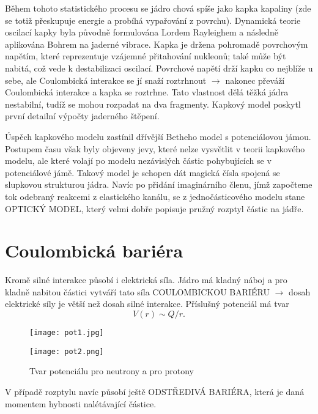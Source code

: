 \documentclass[../../main.tex]{subfiles}
\begin{document}
	Během tohoto statistického procesu se jádro chová spíše jako kapka kapaliny (zde se totiž přeskupuje energie a probíhá vypařování z povrchu). Dynamická teorie oscilací kapky byla původně formulována Lordem Rayleighem a následně aplikována Bohrem na jaderné vibrace. Kapka je držena pohromadě povrchovým napětím, které reprezentuje vzájemné přitahování nukleonů; také může být nabitá, což vede k destabilizaci oscilací. Povrchové napětí drží kapku co nejblíže u sebe, ale Coulombická interakce se jí snaží roztrhnout $\rightarrow$ nakonec převáží Coulombická interakce a kapka se roztrhne. Tato vlastnost dělá těžká jádra nestabilní, tudíž se mohou rozpadat na dva fragmenty. Kapkový model poskytl první detailní výpočty jaderného štěpení. 
	
	Úspěch kapkového modelu zastínil dřívější Betheho model s potenciálovou jámou. Postupem času však byly objeveny jevy, které nelze vysvětlit v teorii kapkového modelu, ale které volají po modelu nezávislých částic pohybujících se v potenciálové jámě. Takový model je schopen dát magická čísla spojená se slupkovou strukturou jádra. Navíc po přidání imaginárního členu, jímž započteme tok odebraný reakcemi z elastického kanálu, se z jednočásticového modelu stane OPTICKÝ MODEL, který velmi dobře popisuje pružný rozptyl částic na jádře.    
	
\section{Coulombická bariéra}

Kromě silné interakce působí i elektrická síla. Jádro má kladný náboj a pro kladně nabitou částici vytváří tato síla COULOMBICKOU BARIÉRU $\rightarrow$ dosah elektrické síly je větší než dosah silné interakce. Příslušný potenciál má tvar
\begin{equation}
V(r) \sim Q/r.
\end{equation}

\begin{figure}[h!]
	\begin{minipage}[c]{0.5\linewidth}
		\texttt{[image: pot1.jpg]}
	\end{minipage}
	\hfill
	\begin{minipage}[c]{0.5\linewidth}
		\texttt{[image: pot2.png]}
	\end{minipage}
	\caption{Tvar potenciálu pro neutrony a pro protony}
\end{figure}

V případě rozptylu navíc působí ještě ODSTŘEDIVÁ BARIÉRA, která je daná momentem hybnosti nalétávající částice.
\end{document}
